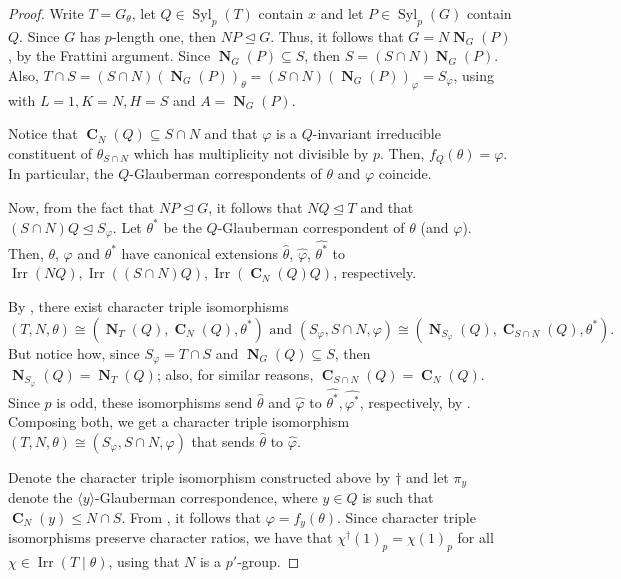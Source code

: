 \documentclass[12pt]{amsart}
\DeclareMathOperator{\CB}{\mathbf{C}}
\DeclareMathOperator{\NB}{\mathbf{N}}
\DeclareMathOperator{\Syl}{Syl}
\DeclareMathOperator{\Irr}{Irr}
\theoremstyle{remark}
\theoremstyle{definition}
\theoremstyle{plain}
\theoremstyle{definition}
\numberwithin{equation}{section}
\begin{document}
\begin{proof}
	Write $T = G_\theta$, let $Q \in \Syl_p(T)$ contain $x$ and let $P \in \Syl_p(G)$ contain $Q$. Since $G$ has $p$-length one, then $NP \unlhd G$. Thus, it follows that $G = N\NB_G(P)$, by the Frattini argument. Since $\NB_G(P) \subseteq S$, then $S = (S \cap N)\NB_G(P)$. Also, $T \cap S = (S\cap N)(\NB_G(P))_\theta = (S\cap N)(\NB_G(P))_\varphi = S_\varphi$, using  with $L = 1, K = N, H = S$ and $A = \NB_G(P)$.
	
	Notice that $\CB_N(Q) \subseteq S \cap N$ and that $\varphi$ is a $Q$-invariant irreducible constituent of $\theta_{S \cap N}$ which has multiplicity not divisible by $p$. Then, $f_Q(\theta) = \varphi$. In particular, the $Q$-Glauberman correspondents of $\theta$ and $\varphi$ coincide.
	
	Now, from the fact that $NP \unlhd G$, it follows that $NQ \unlhd T$ and that $(S \cap N)Q \unlhd S_\varphi$. Let $\theta^*$ be the $Q$-Glauberman correspondent of $\theta$ (and $\varphi$). Then, $\theta$, $\varphi$ and $\theta^*$ have canonical extensions $\widehat{\theta}$, $\widehat{\varphi}$, $\widehat{\theta^*}$ to $\Irr(NQ), \Irr((S \cap N)Q), \Irr(\CB_N(Q)Q)$, respectively. 
	
	By , there exist character triple isomorphisms 
	\begin{equation*}
		(T, N, \theta) \cong (\NB_T(Q), \CB_N(Q), \theta^*) \text{ and } (S_\varphi, S \cap N, \varphi) \cong (\NB_{S_\varphi}(Q), \CB_{S \cap N}(Q), \theta^*).
	\end{equation*} 
	But notice how, since $S_\varphi = T \cap S$ and $\NB_G(Q) \subseteq S$, then $\NB_{S_\varphi}(Q) = \NB_T(Q)$; also, for similar reasons, $\CB_{S \cap N}(Q) = \CB_N(Q)$. Since $p$ is odd, these isomorphisms send $\widehat{\theta}$ and $\widehat{\varphi}$ to $\widehat{\theta^*}, \widehat{\varphi^*}$, respectively, by . Composing both, we get a character triple isomorphism $(T, N, \theta) \cong (S_\varphi, S \cap N, \varphi)$ that sends $\widehat{\theta}$ to $\widehat{\varphi}$.
	
	Denote the character triple isomorphism constructed above by $\dagger$ and let $\pi_y$ denote the $\langle y \rangle$-Glauberman correspondence, where $y \in Q$ is such that $\CB_N(y) \leq N \cap S$. From , it follows that $\varphi = f_y(\theta)$. Since character triple isomorphisms preserve character ratios, we have that $\chi^\dagger(1)_p = \chi(1)_p$ for all $\chi \in \Irr(T \mid \theta)$, using that $N$ is a $p'$-group. 
	

\end{proof}
\end{document}
